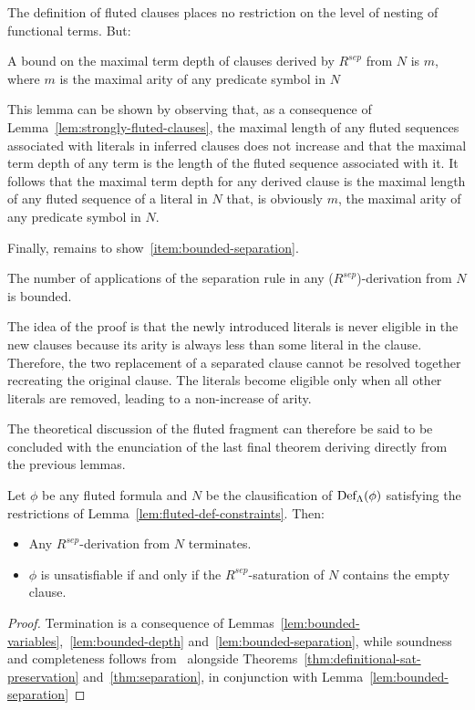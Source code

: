The definition of fluted clauses places no restriction on the level of nesting
of functional terms. But:
\begin{lemma}\label{lem:bounded-depth}
  A bound on the maximal term depth of clauses derived by \(R^{sep}\) from \(N\) is \(m\), where \(m\) is the maximal arity of any predicate symbol in \(N\)
\end{lemma}
This lemma can be shown by observing that, as a consequence of Lemma~\ref{lem:strongly-fluted-clauses}, the maximal length of any fluted sequences associated with literals in inferred clauses does not increase and that the maximal term depth of any term is the length of the fluted sequence associated with it.
It follows that the maximal term depth for any derived clause is the maximal length of any fluted sequence of a literal in \(N\) that, is obviously \(m\), the maximal arity of any predicate symbol in \(N\).

Finally, remains to show~\ref{item:bounded-separation}.

\begin{lemma}\label{lem:bounded-separation}
  The number of applications of the separation rule in any (\(R^{sep}\))-derivation from \(N\) is bounded.
\end{lemma}

The idea of the proof is that the newly introduced literals is never eligible in the new clauses because its arity is always less than some literal in the clause.
Therefore, the two replacement of a separated clause cannot be resolved together recreating the original clause. The literals become eligible only when all other  literals are removed, leading to a non-increase of arity.

The theoretical discussion of the fluted fragment can therefore be said to be concluded with the enunciation of the last final theorem deriving directly from the previous lemmas.

\begin{theorem}
  Let \(\phi\) be any fluted formula and \(N\) be the clausification of \(\fldef{\Lambda}{\phi}\) satisfying the restrictions of Lemma~\ref{lem:fluted-def-constraints}.
  Then:
  \begin{itemize}
    \item Any \(R^{sep}\)-derivation from \(N\) terminates.
    \item \(\phi\) is unsatisfiable if and only if the \(R^{sep}\)-saturation of \(N\) contains the empty clause.
  \end{itemize}
\end{theorem}

\begin{proof}
  Termination is a consequence of Lemmas~\ref{lem:bounded-variables},~\ref{lem:bounded-depth} and~\ref{lem:bounded-separation}, while soundness and completeness follows from~\cite{robinson1965} alongside Theorems~\ref{thm:definitional-sat-preservation} and~\ref{thm:separation}, in conjunction with Lemma~\ref{lem:bounded-separation}
\end{proof}



